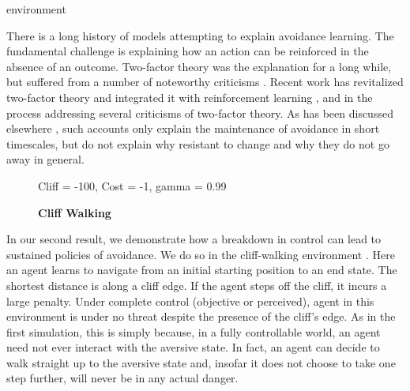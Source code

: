 environment\documentclass[11pt]{article} %
\begin{document}

There is a long history of models attempting to explain avoidance learning. The
fundamental challenge is explaining how an action can be reinforced in the
absence of an outcome. Two-factor theory was the explanation for a long while,
but suffered from a number of noteworthy criticisms \citep{Krypotos2015}.
Recent work has revitalized two-factor theory and integrated it with reinforcement
learning \citep{Moutoussis2008, Maia2010}, and in the process addressing several
criticisms of two-factor theory. As has been discussed elsewhere \citep{Moutoussis2017},
such accounts only explain the maintenance of avoidance in short timescales, but
do not explain why resistant to change and why they do not go away in general.


\begin{figure}
  \centerline{%
  }
  \caption{\textbf{Cliff Walking}}
  \par Cliff = -100, Cost = -1, gamma = 0.99
\end{figure}

In our second result, we demonstrate how a breakdown in control can lead to
sustained policies of avoidance. We do so in the cliff-walking environment
\citep{SuttonBarto1998, SuttonBarto2018, Gaskett2003}. Here an agent learns to navigate from
an initial starting position to an end state. The shortest distance is along a
cliff edge. If the agent steps off the cliff, it incurs a large penalty. Under
complete control (objective or perceived), agent in this environment is under no
threat despite the presence of the cliff's edge. As in the first simulation, this
is simply because, in a fully controllable world, an agent need not ever interact
with the aversive state. In fact, an agent can decide to walk straight up to the
aversive state and, insofar it does not choose to take one step further, will
never be in any actual danger.
\end{document}
